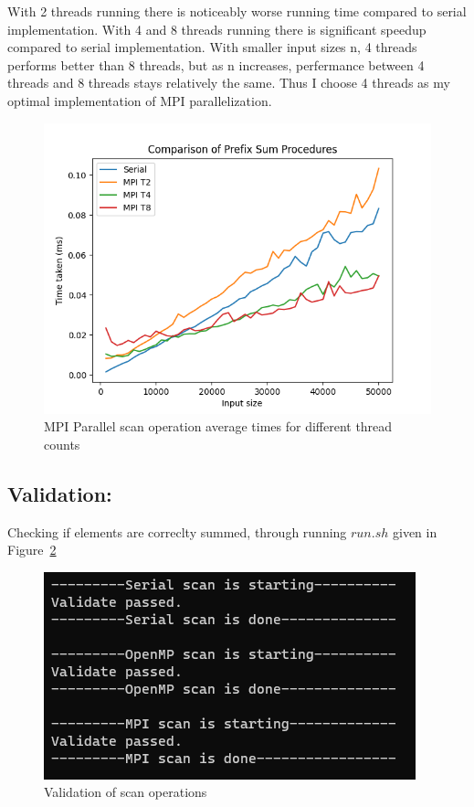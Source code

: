 	With 2 threads running there is noticeably worse running time compared to serial implementation. With 4 and 8 threads running there is significant speedup compared to serial implementation. With smaller input sizes n, 4 threads performs better than 8 threads, but as n increases, perfermance between 4 threads and 8 threads stays relatively the same. Thus I choose 4 threads as my optimal implementation of MPI parallelization.
	\begin{figure}[!htb]
		\centering
		\includegraphics[width=0.6\linewidth]{scan_mpi_comparison.png}
		\caption{MPI Parallel scan operation average times for different thread counts}
		\label{fig:fig_scan_mpi_comparison}
	\end{figure}

	\subsection{Validation:}
	Checking if elements are correclty summed, through running $run.sh$ given in Figure~\ref{fig:fig_scan_validation}
	\begin{figure}[!htb]
		\centering
		\includegraphics[width=0.5\linewidth]{scan_validation.png}
		\caption{Validation of scan operations}
		\label{fig:fig_scan_validation}
	\end{figure}

